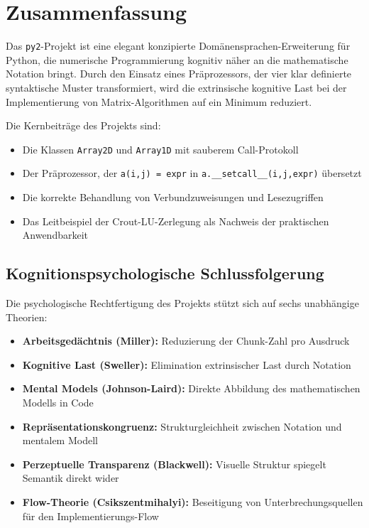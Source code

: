 ﻿\documentclass[a4paper,12pt]{article}
\theoremstyle{definition}
\begin{document}
\section{Zusammenfassung}

Das \texttt{py2}-Projekt ist eine elegant konzipierte Dom\"anensprachen-Erweiterung
f\"ur Python, die numerische Programmierung kognitiv n\"aher an die mathematische
Notation bringt. Durch den Einsatz eines Pr\"aprozessors, der vier klar definierte
syntaktische Muster transformiert, wird die extrinsische kognitive Last bei der
Implementierung von Matrix-Algorithmen auf ein Minimum reduziert.

Die Kernbeitr\"age des Projekts sind:

\begin{itemize}
	\item Die Klassen \texttt{Array2D} und \texttt{Array1D} mit sauberem Call-Protokoll
	\item Der Pr\"aprozessor, der \texttt{a(i,j) = expr} in \texttt{a.\_\_setcall\_\_(i,j,expr)}
	      \"ubersetzt
	\item Die korrekte Behandlung von Verbundzuweisungen und Lesezugriffen
	\item Das Leitbeispiel der Crout-LU-Zerlegung als Nachweis der praktischen Anwendbarkeit
\end{itemize}

\subsection{Kognitionspsychologische Schlussfolgerung}

Die psychologische Rechtfertigung des Projekts st\"utzt sich auf sechs unabh\"angige
Theorien:

\begin{itemize}
	\item \textbf{Arbeitsged\"achtnis (Miller):} Reduzierung der Chunk-Zahl pro Ausdruck
	\item \textbf{Kognitive Last (Sweller):} Elimination extrinsischer Last durch Notation
	\item \textbf{Mental Models (Johnson-Laird):} Direkte Abbildung des mathematischen
	      Modells in Code
	\item \textbf{Repr\"asentationskongruenz:} Strukturgleichheit zwischen Notation
	      und mentalem Modell
	\item \textbf{Perzeptuelle Transparenz (Blackwell):} Visuelle Struktur spiegelt
	      Semantik direkt wider
	\item \textbf{Flow-Theorie (Csikszentmihalyi):} Beseitigung von Unterbrechungsquellen
	      f\"ur den Implementierungs-Flow
\end{itemize}
\end{document}
